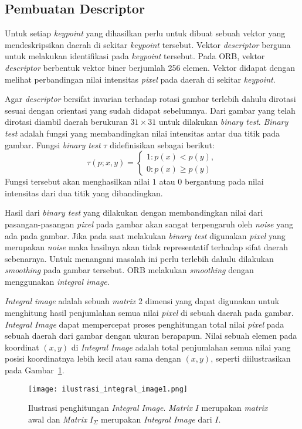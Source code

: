 \subsection{Pembuatan Descriptor}
Untuk setiap \textit{keypoint} yang dihasilkan perlu untuk dibuat sebuah vektor yang mendeskripsikan daerah di sekitar \textit{keypoint} tersebut. Vektor \textit{descriptor} berguna untuk melakukan identifikasi pada \textit{keypoint} tersebut. Pada ORB, vektor \textit{descriptor} berbentuk vektor biner berjumlah 256 elemen. Vektor didapat dengan melihat perbandingan nilai intensitas \textit{pixel} pada daerah di sekitar \textit{keypoint}.

Agar \textit{descriptor} bersifat invarian terhadap rotasi gambar terlebih dahulu dirotasi sesuai dengan orientasi yang sudah didapat sebelumnya. Dari gambar yang telah dirotasi diambil daerah berukuran $31\times31$ untuk dilakukan \textit{binary test}. \textit{Binary test} adalah fungsi yang membandingkan nilai intensitas antar dua titik pada gambar. Fungsi \textit{binary test} $\tau$ didefinisikan sebagai berikut:
\begin{equation}
	\tau(p;x,y)=\begin{cases}
		1 :p(x) < p(y), \\
		0 :p(x) \geq p(y)
	\end{cases}
\end{equation}
Fungsi tersebut akan menghasilkan nilai $1$ atau $0$ bergantung pada nilai intensitas dari dua titik yang dibandingkan.

Hasil dari \textit{binary test} yang dilakukan dengan membandingkan nilai dari pasangan-pasangan \textit{pixel} pada gambar akan sangat terpengaruh oleh \textit{noise} yang ada pada gambar. Jika pada saat melakukan \textit{binary test} digunakan \textit{pixel} yang merupakan \textit{noise} maka hasilnya akan tidak representatif terhadap sifat daerah sebenarnya. Untuk menangani masalah ini perlu terlebih dahulu dilakukan \textit{smoothing} pada gambar tersebut. ORB melakukan \textit{smoothing} dengan menggunakan \textit{integral image}. 

\textit{Integral image} adalah sebuah \textit{matrix} 2 dimensi yang dapat digunakan untuk menghitung hasil penjumlahan semua nilai \textit{pixel} di sebuah daerah pada gambar. \textit{Integral Image} dapat mempercepat proses penghitungan total nilai \textit{pixel} pada sebuah daerah dari gambar dengan ukuran berapapun. Nilai sebuah elemen pada koordinat $(x,y)$ di \textit{Integral Image} adalah total penjumlahan semua nilai yang posisi koordinatnya lebih kecil atau sama dengan $(x,y)$, seperti diilustrasikan pada Gambar~\ref{fig:integral_image1}.
\begin{figure}[H]
	\centering
	\texttt{[image: ilustrasi\_integral\_image1.png]}
	\caption{Ilustrasi penghitungan \textit{Integral Image}. \textit{Matrix} $I$ merupakan \textit{matrix} awal dan \textit{Matrix} $I_\Sigma$ merupakan \textit{Integral Image} dari $I$.}
	\label{fig:integral_image1}
\end{figure}

